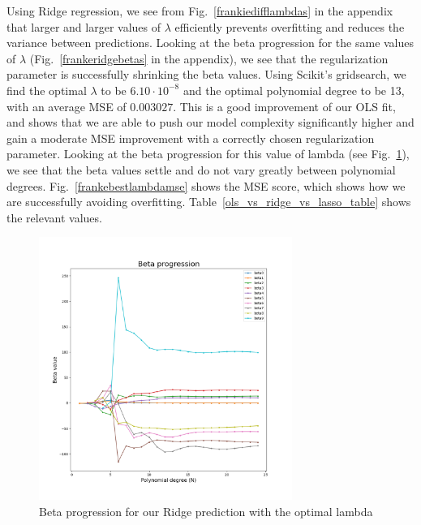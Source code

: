 \documentclass[twocolumn,10pt,cleanfoot]{asme2ej}
\begin{document}
Using Ridge regression, we see from Fig.~\ref{frankiedifflambdas} in the appendix that larger and larger values of $\lambda$ efficiently prevents overfitting and reduces the variance between predictions. Looking at the beta progression for the same values of $\lambda$ (Fig.~\ref{frankeridgebetas} in the appendix), we see that the regularization parameter is successfully shrinking the beta values. Using Scikit's gridsearch, we find the optimal $\lambda$ to be $6.10 \cdot 10^{-8}$ and the optimal polynomial degree to be 13, with an average MSE of $0.003027$. This is a good improvement of our OLS fit, and shows that we are able to push our model complexity significantly higher and gain a moderate MSE improvement with a correctly chosen regularization parameter. Looking at the beta progression for this value of lambda (see Fig.~\ref{frankebestlambdabetas}), we see that the beta values settle and do not vary greatly between polynomial degrees. Fig.~\ref{frankebestlambdamse} shows the MSE score, which shows how we are successfully avoiding overfitting. Table~\ref{ols_vs_ridge_vs_lasso_table} shows the relevant values.

\begin{figure}[h]
\centerline{\includegraphics[width=3.25in]{figure/frankebestlambdabetas.png}}
\caption{Beta progression for our Ridge prediction with the optimal lambda}
\label{frankebestlambdabetas}
\end{figure}
\end{document}

